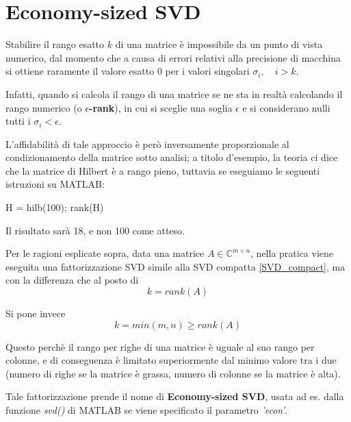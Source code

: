 \section{Economy-sized SVD}
\label{sec:SVD_econ}
Stabilire il rango esatto $k$ di una matrice è impossibile da un punto di vista 
numerico, dal momento che a causa di errori relativi alla precisione di macchina 
si ottiene raramente il valore esatto 0 per i valori singolari $\sigma_i, \quad 
i > k$.

Infatti, quando si calcola il rango di una matrice se ne sta in realtà 
calcolando il rango numerico (o \textbf{$\epsilon$-rank}), in cui si sceglie una 
soglia $\epsilon$ e si considerano nulli tutti i $\sigma_i < \epsilon$.

L'affidabilità di tale approccio è però inversamente proporzionale al 
condizionamento della matrice sotto analisi; a titolo d'esempio, la teoria ci 
dice che la matrice di Hilbert è a rango pieno, tuttavia se eseguiamo le 
seguenti istruzioni su MATLAB:

\begin{programma}
H = hilb(100);
rank(H)
\end{programma}

Il risultato sarà 18, e non 100 come atteso.

Per le ragioni esplicate sopra, data una matrice $A \in \mathbb{C}^{m \times 
n}$, nella pratica viene eseguita una fattorizzazione SVD simile alla SVD 
compatta \eqref{SVD_compact}, ma con la differenza che al posto di
\begin{equation*}
k = rank(A)
\end{equation*}

Si pone invece
\begin{equation*}
k = min(m,n) \geq rank(A)
\end{equation*}

Questo perchè il rango per righe di una matrice è uguale al suo rango per 
colonne, e di conseguenza è limitato superiormente dal minimo valore tra i due 
(numero di righe se la matrice è grassa, numero di colonne se la matrice è 
alta).

Tale fattorizzazione prende il nome di \textbf{Economy-sized SVD}, usata ad es. 
dalla funzione \textit{svd()} di MATLAB se viene specificato il parametro 
\textit{'econ'}.
